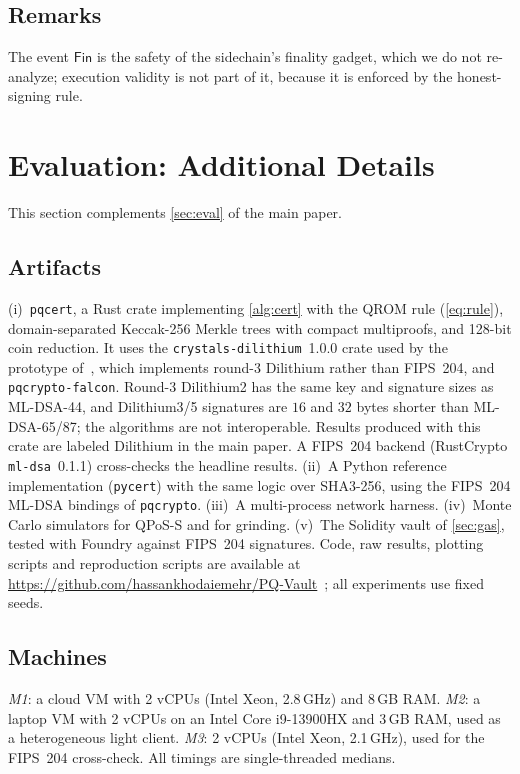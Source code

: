 \documentclass[10pt,journal,compsoc]{IEEEtran}
\theoremstyle{tplain}
\theoremstyle{tdef}
\theoremstyle{remark}
\begin{document}
\subsection{Remarks}
The event $\mathsf{Fin}$ is the safety of the sidechain's finality gadget, which we do not re-analyze; execution validity is not part of it, because it is enforced by the honest-signing rule.
\section{Evaluation: Additional Details}\label{S-eval}

This section complements \cref{sec:eval} of the main paper.

\subsection{Artifacts}\label{S-eval-artifacts}
(i)~\texttt{pqcert}, a Rust crate implementing \cref{alg:cert} with the QROM rule (\cref{eq:rule}), domain-separated Keccak-256 Merkle trees with compact multiproofs, and 128-bit coin reduction. It uses the \texttt{crystals-dilithium}~1.0.0 crate used by the prototype of~\cite{NIROPoK2025}, which implements round-3 Dilithium rather than FIPS~204, and \texttt{pqcrypto-falcon}. Round-3 Dilithium2 has the same key and signature sizes as ML-DSA-44, and Dilithium3/5 signatures are $16$ and $32$ bytes shorter than ML-DSA-65/87; the algorithms are not interoperable. Results produced with this crate are labeled Dilithium in the main paper. A FIPS~204 backend (RustCrypto \texttt{ml-dsa}~0.1.1) cross-checks the headline results. (ii)~A Python reference implementation (\texttt{pycert}) with the same logic over SHA3-256, using the FIPS~204 ML-DSA bindings of \texttt{pqcrypto}. (iii)~A multi-process network harness. (iv)~Monte Carlo simulators for QPoS-S and for grinding. (v)~The Solidity vault of \cref{sec:gas}, tested with Foundry against FIPS~204 signatures. Code, raw results, plotting scripts and reproduction scripts are available at \url{https://github.com/hassankhodaiemehr/PQ-Vault}~\cite{pqvault_artifact}; all experiments use fixed seeds.

\subsection{Machines}\label{S-eval-machines}
\emph{M1}: a cloud VM with 2 vCPUs (Intel Xeon, 2.8\,GHz) and 8\,GB RAM. \emph{M2}: a laptop VM with 2 vCPUs on an Intel Core i9-13900HX and 3\,GB RAM, used as a heterogeneous light client. \emph{M3}: 2 vCPUs (Intel Xeon, 2.1\,GHz), used for the FIPS~204 cross-check. All timings are single-threaded medians.
\end{document}
